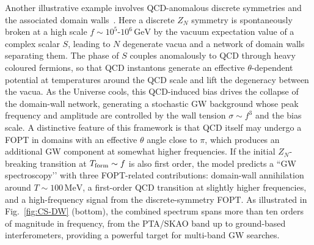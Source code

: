 \documentclass[a4paper,11pt]{article}
\begin{document}
Another illustrative example involves QCD-anomalous discrete symmetries and the associated domain walls~\citep{Chen:2023QCDPT}.
Here a discrete $Z_N$ symmetry is spontaneously broken at a high scale $f \sim 10^5$-$10^6\,\mathrm{GeV}$ by the vacuum
expectation value of a complex scalar $S$, leading to $N$ degenerate vacua and a network of domain walls separating them. 
The phase of $S$ couples anomalously to QCD through heavy coloured fermions, so that QCD instantons generate an effective
$\theta$-dependent potential at temperatures around the QCD scale and lift the degeneracy between the vacua. As the Universe
cools, this QCD-induced bias drives the collapse of the domain-wall network, generating a stochastic GW background whose peak
frequency and amplitude are controlled by the wall tension $\sigma \sim f^3$ and the bias scale. A distinctive feature of this
framework is that QCD itself may undergo a FOPT in domains with an effective $\theta$ angle close to $\pi$, which produces 
an additional GW component at somewhat higher frequencies. If the initial $Z_N$-breaking transition at $T_{\rm form}\sim f$ is
also first order, the model predicts a ``GW spectroscopy’’ with three FOPT-related contributions: domain-wall annihilation
around $T\sim 100\,\mathrm{MeV}$, a first-order QCD transition at slightly higher frequencies, and a high-frequency signal 
from the discrete-symmetry FOPT. As illustrated in Fig.~\ref{fig:CS-DW} (bottom), the combined spectrum spans more than ten
orders of magnitude in frequency, from the PTA/SKAO band up to ground-based interferometers, providing a powerful target 
for multi-band GW searches.
\end{document}
